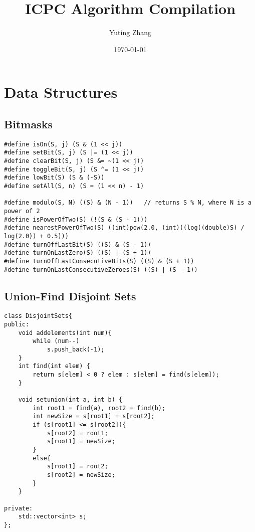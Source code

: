 \documentclass[letterpaper]{article}
\title{ICPC Algorithm Compilation}
\date{\today}
\author{Yuting Zhang}
\begin{document}
\maketitle
\thispagestyle{empty}
\newpage
\pagestyle{plain}
\tableofcontents
\setcounter{page}{1}
\newpage

\setcounter{page}{1}
\section{Data Structures}
\subsection{Bitmasks}
\begin{lstlisting}
#define isOn(S, j) (S & (1 << j))
#define setBit(S, j) (S |= (1 << j))
#define clearBit(S, j) (S &= ~(1 << j))
#define toggleBit(S, j) (S ^= (1 << j))
#define lowBit(S) (S & (-S))
#define setAll(S, n) (S = (1 << n) - 1)

#define modulo(S, N) ((S) & (N - 1))   // returns S % N, where N is a power of 2
#define isPowerOfTwo(S) (!(S & (S - 1)))
#define nearestPowerOfTwo(S) ((int)pow(2.0, (int)((log((double)S) / log(2.0)) + 0.5)))
#define turnOffLastBit(S) ((S) & (S - 1))
#define turnOnLastZero(S) ((S) | (S + 1))
#define turnOffLastConsecutiveBits(S) ((S) & (S + 1))
#define turnOnLastConsecutiveZeroes(S) ((S) | (S - 1))
\end{lstlisting}

\subsection{Union-Find Disjoint Sets}
\begin{lstlisting}
class DisjointSets{
public:
	void addelements(int num){
		while (num--)
			s.push_back(-1);
	}
	int find(int elem) {
		return s[elem] < 0 ? elem : s[elem] = find(s[elem]); 
	}

	void setunion(int a, int b) {
		int root1 = find(a), root2 = find(b);
		int newSize = s[root1] + s[root2];
		if (s[root1] <= s[root2]){
			s[root2] = root1;
			s[root1] = newSize;
		}
		else{
			s[root1] = root2;
			s[root2] = newSize;
		}
	}

private:
    std::vector<int> s;
};
\end{lstlisting}
\newpage
\end{document}
